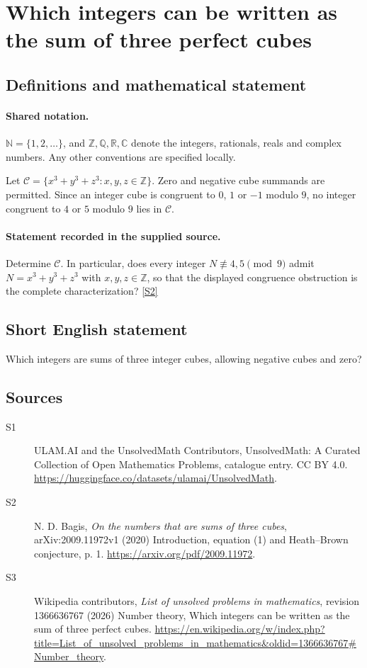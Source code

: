 \documentclass[11pt]{article}
\newcommand{\sref}[2]{\hyperlink{source:#1:#2}{[S#2]}}
\begin{document}
\section{Which integers can be written as the sum of three perfect cubes}\label{statement}

\subsection{Definitions and mathematical statement}

\paragraph{Shared notation.}$\mathbb N=\{1,2,\ldots\}$, and $\mathbb Z,\mathbb Q,\mathbb R,\mathbb C$ denote the integers, rationals, reals and complex numbers. Any other conventions are specified locally.


Let $\mathcal C=\{x^3+y^3+z^3:x,y,z\in\mathbb Z\}$. Zero and negative cube summands are permitted. Since an integer cube is congruent to $0$, $1$ or $-1$ modulo $9$, no integer congruent to $4$ or $5$ modulo $9$ lies in $\mathcal C$.
\paragraph{Statement recorded in the supplied source.}
Determine $\mathcal C$. In particular, does every integer $N\not\equiv4,5\pmod9$ admit $N=x^3+y^3+z^3$ with $x,y,z\in\mathbb Z$, so that the displayed congruence obstruction is the complete characterization? \sref{statement}{2}
\subsection{Short English statement}
Which integers are sums of three integer cubes, allowing negative cubes and zero?
\subsection{Sources}
\begin{description}
\item[\hypertarget{source:statement:1}{S1}] ULAM.AI and the UnsolvedMath Contributors, UnsolvedMath: A Curated Collection of Open Mathematics Problems, catalogue entry. CC BY 4.0. \url{https://huggingface.co/datasets/ulamai/UnsolvedMath}.
\item[\hypertarget{source:statement:2}{S2}] N. D. Bagis, \emph{On the numbers that are sums of three cubes}, arXiv:2009.11972v1 (2020) Introduction, equation (1) and Heath--Brown conjecture, p. 1. \url{https://arxiv.org/pdf/2009.11972}.
\item[\hypertarget{source:statement:3}{S3}] Wikipedia contributors, \emph{List of unsolved problems in mathematics}, revision 1366636767 (2026) Number theory, Which integers can be written as the sum of three perfect cubes. \url{https://en.wikipedia.org/w/index.php?title=List_of_unsolved_problems_in_mathematics&oldid=1366636767#Number_theory}.
\end{description}
\label{end:statement}
\end{document}
